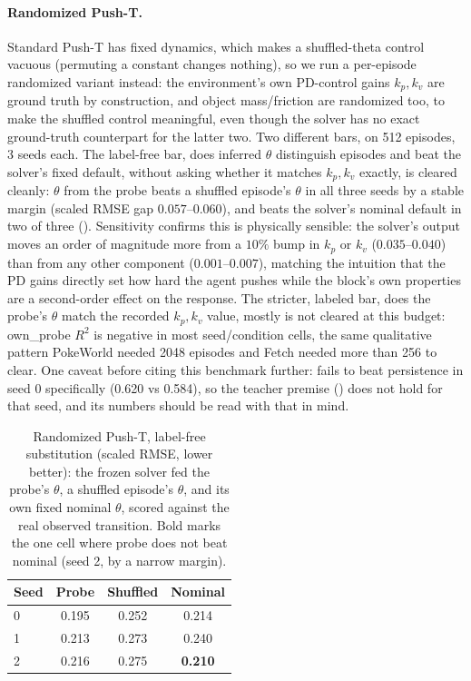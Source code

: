 \paragraph{Randomized Push-T.} Standard Push-T has fixed dynamics,
which makes a shuffled-theta control vacuous (permuting a constant
changes nothing), so we run a per-episode randomized variant instead:
the environment's own PD-control gains $k_p, k_v$ are ground truth by
construction, and object mass/friction are randomized too, to make the
shuffled control meaningful, even though the solver has no exact
ground-truth counterpart for the latter two. Two different bars, on
512 episodes, 3 seeds each. The label-free bar, does inferred $\theta$
distinguish episodes and beat the solver's fixed default, without
asking whether it matches $k_p, k_v$ exactly, is cleared cleanly:
$\theta$ from the probe beats a shuffled episode's $\theta$ in all
three seeds by a stable margin (scaled RMSE gap $0.057$--$0.060$), and
beats the solver's nominal default in two of three ().
Sensitivity confirms this is physically sensible: the solver's output
moves an order of magnitude more from a $10\%$ bump in $k_p$ or $k_v$
($0.035$--$0.040$) than from any other component
($0.001$--$0.007$), matching the intuition that the PD gains directly
set how hard the agent pushes while the block's own properties are a
second-order effect on the response. The stricter, labeled bar, does
the probe's $\theta$ match the recorded $k_p, k_v$ value, mostly is not
cleared at this budget: own\_probe $R^2$ is negative in most
seed/condition cells, the same qualitative pattern PokeWorld needed
2048 episodes and Fetch needed more than 256 to clear. One caveat
before citing this benchmark further: \pathA fails to beat persistence
in seed 0 specifically (0.620 vs 0.584), so the teacher premise
() does not hold for that seed, and its
numbers should be read with that in mind.

\begin{table}[t]
\centering
\begin{tabular}{lccc}
\toprule
Seed & Probe & Shuffled & Nominal \\
\midrule
0 & 0.195 & 0.252 & 0.214 \\
1 & 0.213 & 0.273 & 0.240 \\
2 & 0.216 & 0.275 & \textbf{0.210} \\
\bottomrule
\end{tabular}
\caption{Randomized Push-T, label-free substitution (scaled RMSE, lower
better): the frozen solver fed the probe's $\theta$, a shuffled
episode's $\theta$, and its own fixed nominal $\theta$, scored against
the real observed transition. Bold marks the one cell where probe does
not beat nominal (seed 2, by a narrow margin).}
\label{tab:pusht-rand-xbench}
\end{table}

